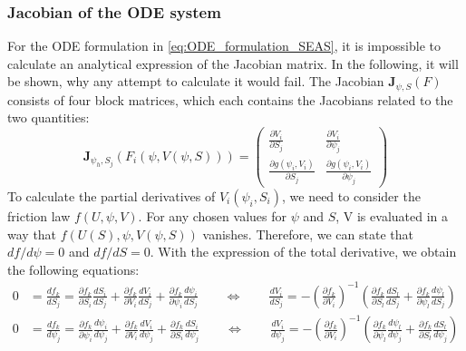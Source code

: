 \documentclass{report}
\begin{document}
\subsubsection{Jacobian of the ODE system}
\label{sssec:Jacobian_ODE}
For the ODE formulation in \autoref{eq:ODE_formulation_SEAS}, it is impossible to calculate an analytical expression of the Jacobian matrix. In the following, it will be shown, why any attempt to calculate it would fail. The Jacobian $\mathbf{J}_{\psi,S}(F)$ consists of four block matrices, which each contains the Jacobians related to the two quantities:
\begin{equation}
	\label{eq:Jacobian_ODE_formulation}
	\mathbf{J}_{\psi_h,S_j}\left(F_i\left(\psi,V(\psi,S)\right)\right) = \begin{pmatrix} 
	\frac{\partial V_i}{\partial S_j} &
	\frac{\partial V_i}{\partial \psi_j} \\ 
	\frac{\partial g(\psi_i,V_i)}{\partial S_j} &
	\frac{\partial g(\psi_i,V_i)}{\partial \psi_j}  \end{pmatrix}
\end{equation}
To calculate the partial derivatives of $V_i(\psi_i,S_i)$, we need to consider the friction law $f(U, \psi,V)$. For any chosen values for $\psi$ and $S$, V is evaluated in a way that $f(U(S), \psi, V(\psi,S))$ vanishes. Therefore, we can state that $df/d\psi = 0$ and $df/dS = 0$. With the expression of the total derivative, we obtain the following equations:
\begin{align}
	0 &= \frac{df_k}{dS_j} =     
	\frac{\partial f_k}{\partial S_i}\frac{d S_i}{d S_j} + 
	\frac{\partial f_k}{\partial V_i}\frac{d V_i}{d S_j} + 
	\frac{\partial f_k}{\partial \psi_i}\frac{d \psi_i}{d S_j} 
	\qquad\Leftrightarrow\qquad
	\frac{d V_i}{d S_j} = -\left(\frac{\partial f_k}{\partial V_i}\right)^{-1}\left(\frac{\partial f_k}{\partial S_l}\frac{d S_l}{d S_j} + \frac{\partial f_k}{\partial \psi_l}\frac{d \psi_l}{d S_j} \right) 
	\label{eq:SEASDAE_totaldV_dS} \\
	0 &= \frac{df_k}{d\psi_j} = 
	\frac{\partial f_k}{\partial \psi_i}\frac{d \psi_i}{d \psi_j} + 
	\frac{\partial f_k}{\partial V_i}\frac{d V_i}{d \psi_j} + 
	\frac{\partial f_k}{\partial S_i}\frac{d S_i}{d \psi_j}
	\qquad\Leftrightarrow\qquad
	\frac{d V_i}{d \psi_j} = -\left(\frac{\partial f_k}{\partial V_i}\right)^{-1}\left(\frac{\partial f_k}{\partial \psi_l}\frac{d \psi_l}{d \psi_j}  + 
	\frac{\partial f_k}{\partial S_l} \frac{d S_l}{d \psi_j}\right)
	\label{eq:SEASDAE_totaldV_dpsi}
\end{align}
\end{document}
